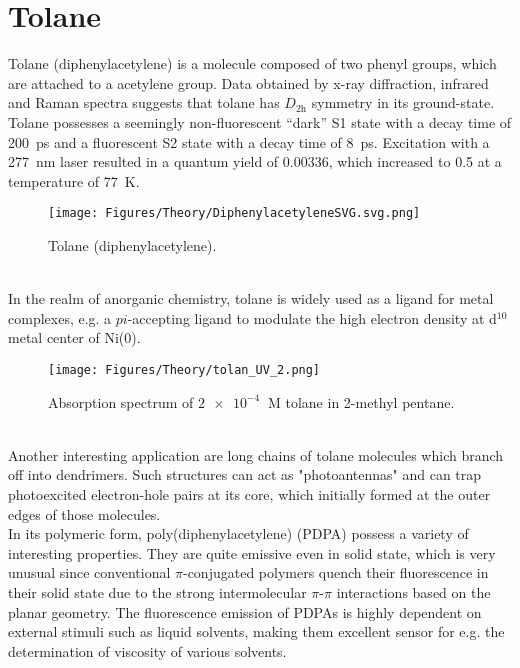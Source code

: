 \section{Tolane}
Tolane (diphenylacetylene) is a molecule composed of two phenyl groups, which are attached to a acetylene group. Data obtained by x-ray diffraction\cite{tol_xray}, infrared\cite{tol_infra} and Raman\cite{tol_raman} spectra suggests that tolane has $D_{2\mathrm{h}}$ symmetry in its ground-state. Tolane possesses a seemingly non-fluorescent ``dark'' S1 state with a decay time of \SI{200}{\pico\second}
and a fluorescent S2 state with a decay time of \SI{8}{\pico\second}.\cite{tol_states} Excitation with a \SI{277}{\nano\meter} laser resulted in a quantum yield of 0.00336, which increased to 0.5 at a temperature of \SI{77}{K}.\cite{tol_1}
%
%
\begin{figure}[h]
\centering
\texttt{[image: Figures/Theory/DiphenylacetyleneSVG.svg.png]}
\caption{Tolane (diphenylacetylene).}
\label{fig:tolane}
\end{figure}\\
%
In the realm of anorganic chemistry, tolane is widely used as a ligand for metal complexes, e.g. a $pi$-accepting ligand to modulate the high electron density at d$^{10}$ metal center of Ni(0).\cite{tol_ligand} \\
%
\begin{figure}[h]
\centering
\texttt{[image: Figures/Theory/tolan\_UV\_2.png]}
\caption{Absorption spectrum of $\SI{2e-4}{}$ M tolane in 2-methyl pentane.\cite{tol_uv_spec}}
\label{fig:tolane_UV}
\end{figure}\\
%
Another interesting application are long chains of tolane molecules which branch off into dendrimers. Such structures can act as "photoantennas" and can trap photoexcited electron-hole pairs at its core, which initially formed at the outer edges of those molecules.\cite{tol_dendrimer}\\
In its polymeric form, poly(diphenylacetylene) (PDPA) possess a variety of interesting properties. They are quite emissive even in solid state,\cite{tol_emission} which is very unusual since conventional $\pi$-conjugated polymers quench their fluorescence in their solid state due to the strong intermolecular $\pi$-$\pi$ interactions based on the planar geometry.\cite{tol_pi_polymer} The fluorescence emission of PDPAs is highly dependent on external stimuli such as liquid solvents, making them excellent sensor for e.g. the determination of viscosity of various solvents.\cite{tol_sensor}




